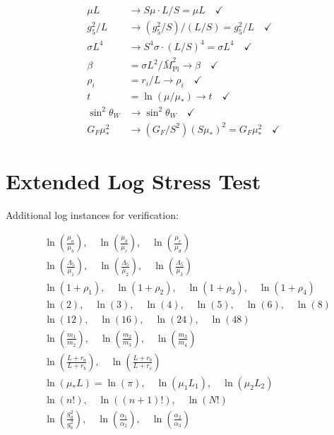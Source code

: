 \documentclass[11pt,a4paper]{article}
\theoremstyle{definition}
\begin{document}
\begin{align}
\label{eq:inv_ver_1}
\mu L &\to S\mu \cdot L/S = \mu L \quad \checkmark \\
\label{eq:inv_ver_2}
g_5^2/L &\to (g_5^2/S)/(L/S) = g_5^2/L \quad \checkmark \\
\label{eq:inv_ver_3}
\sigma L^4 &\to S^4\sigma \cdot (L/S)^4 = \sigma L^4 \quad \checkmark \\
\label{eq:inv_ver_4}
\beta &= \sigma L^2/\bar{M}_{\text{Pl}}^2 \to \beta \quad \checkmark \\
\label{eq:inv_ver_5}
\rho_i &= r_i/L \to \rho_i \quad \checkmark \\
\label{eq:inv_ver_6}
t &= \ln(\mu/\mu_*) \to t \quad \checkmark \\
\label{eq:inv_ver_7}
\sin^2\theta_W &\to \sin^2\theta_W \quad \checkmark \\
\label{eq:inv_ver_8}
G_F\mu_*^2 &\to (G_F/S^2)(S\mu_*)^2 = G_F\mu_*^2 \quad \checkmark
\end{align}

\section{Extended Log Stress Test}
\label{app:log_extended}

Additional log instances for verification:

\begin{align}
\label{eq:log_ext_1}
&\ln\left(\frac{\mu_a}{\mu_b}\right), \quad \ln\left(\frac{\mu_b}{\mu_c}\right), \quad \ln\left(\frac{\mu_c}{\mu_d}\right) \\
\label{eq:log_ext_2}
&\ln\left(\frac{\Lambda_5}{\mu_1}\right), \quad \ln\left(\frac{\Lambda_5}{\mu_2}\right), \quad \ln\left(\frac{\Lambda_5}{\mu_3}\right) \\
\label{eq:log_ext_3}
&\ln(1 + \rho_1), \quad \ln(1 + \rho_2), \quad \ln(1 + \rho_3), \quad \ln(1 + \rho_4) \\
\label{eq:log_ext_4}
&\ln(2), \quad \ln(3), \quad \ln(4), \quad \ln(5), \quad \ln(6), \quad \ln(8) \\
\label{eq:log_ext_5}
&\ln(12), \quad \ln(16), \quad \ln(24), \quad \ln(48) \\
\label{eq:log_ext_6}
&\ln\left(\frac{m_1}{m_2}\right), \quad \ln\left(\frac{m_2}{m_3}\right), \quad \ln\left(\frac{m_3}{m_4}\right) \\
\label{eq:log_ext_7}
&\ln\left(\frac{L + r_a}{L + r_b}\right), \quad \ln\left(\frac{L + r_b}{L + r_c}\right) \\
\label{eq:log_ext_8}
&\ln(\mu_* L) = \ln(\pi), \quad \ln(\mu_1 L_1), \quad \ln(\mu_2 L_2) \\
\label{eq:log_ext_9}
&\ln(n!), \quad \ln((n+1)!), \quad \ln(N!) \\
\label{eq:log_ext_10}
&\ln\left(\frac{g_a^2}{g_b^2}\right), \quad \ln\left(\frac{\alpha_1}{\alpha_2}\right), \quad \ln\left(\frac{\alpha_2}{\alpha_3}\right)
\end{align}
\end{document}
